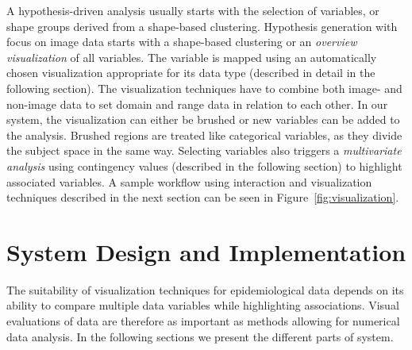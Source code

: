 \documentclass[journal]{style/vgtc} 			          %
\newcommand{\rem}[1]{\textcolor{red}{\sout{#1}}}
\begin{document}
%
A hypothesis-driven analysis usually starts with the selection of variables, or shape groups derived from a shape-based clustering.
%
Hypothesis generation with focus on image data starts with a shape-based clustering or an \emph{overview visualization} of all variables.
%
The variable is mapped using an automatically chosen visualization appropriate for its data type (described in detail in the following section).
%
The visualization techniques have to combine both image- and non-image data to set domain and range data in relation to each other.
%
In our system, the visualization can either be brushed or new variables can be added to the analysis. 
%
%
Brushed regions are treated like categorical variables, as they divide the subject space in the same way.
%
Selecting variables also triggers a \emph{multivariate analysis} using contingency values (described in the following section) to highlight associated variables.  %
%
A sample workflow using interaction and visualization techniques described in the next section can be seen in Figure~\ref{fig:visualization}.

\section{System Design and Implementation} \label{Interaction- and Visualization Techniques}
%
The suitability of visualization techniques for epidemiological data depends on its ability to compare multiple data variables while highlighting associations.
%
%
Visual evaluations of data are therefore as important as methods allowing for numerical data analysis.
%
In the following sections we present the different parts of system.
\end{document}

